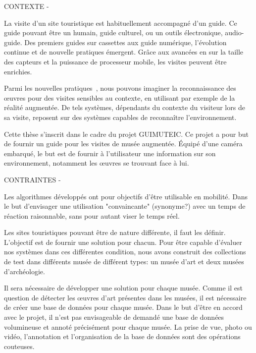 CONTEXTE - 

La visite d'un site touristique est habituellement accompagné d'un guide. Ce guide pouvant être un humain, guide culturel, ou un outils électronique, audio-guide. Des premiers guides sur cassettes aux guide numérique, l'évolution continue et de nouvelle pratiques émergent. Grâce aux avancées en sur la taille des capteurs et la puissance de processeur mobile, les visites peuvent être enrichies.

Parmi les nouvelles pratiques~\cite{andr2014}, nous pouvons imaginer la reconnaissance des œuvres pour des visites sensibles au contexte, en utilisant par exemple de la réalité augmentée. De tels systèmes, dépendants du contexte du visiteur lors de sa visite, reposent sur des systèmes capables de reconnaître l'environnement.

Cette thèse s'inscrit dans le cadre du projet GUIMUTEIC. Ce projet a pour but de fournir un guide pour les visites de musée augmentée. Équipé d'une caméra embarqué, le but est de fournir à l'utilisateur une information sur son environnement, notamment les œuvres se trouvant face à lui.



CONTRAINTES - 

Les algorithmes développés ont pour objectifs d'être utilisable en mobilité. Dans le but d'envisager une utilisation "convaincante" (synonyme?)  avec un temps de réaction raisonnable, sans pour autant viser le temps réel.

Les sites touristiques pouvant être de nature différente, il faut les définir. L'objectif est de fournir une solution pour chacun. Pour être capable d'évaluer nos systèmes dans ces différentes condition, nous avons construit des collections de test dans différents musée de différent types: un musée d'art et deux musées d'archéologie.

Il sera nécessaire de développer une solution pour chaque musée. Comme il est question de détecter les œuvres d'art présentes dans les musées, il est nécessaire de créer une base de données pour chaque musée. Dans le but d'être en accord avec le projet, il n'est pas envisageable de demandé une base de données volumineuse et annoté précisément pour chaque musée. La prise de vue, photo ou vidéo, l'annotation et l'organisation de la base de données sont des opérations couteuses.

